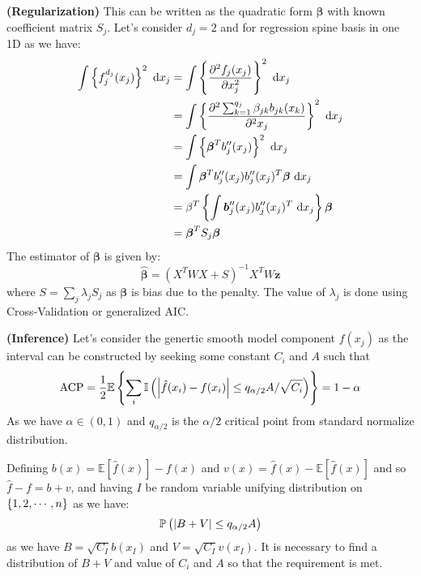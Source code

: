 \begin{remark}{\textbf{(Regularization)}}
    This can be written as the quadratic form $\boldsymbol \beta$ with known coefficient matrix $S_j$. Let's consider $d_j=2$ and for regression spine basis in one 1D as we have:
    \begin{equation*}
    \begin{aligned}
        \int \left\{ f^{d_j}_j(x_j) \right\}^2 \ \mathrm{d} x_j &= \int \left\{ \frac{\partial^2 f_j(x_j)}{\partial x_j^2} \right\}^2\ \mathrm{d} x_j \\
        &= \int \left\{ \frac{\partial^2 \sum^{q_j}_{k=1} \beta_{jk}b_{jk}(x_k) }{\partial^2 x_j} \right\}^2\ \mathrm{d} x_j \\
        &= \int \left\{ \boldsymbol \beta^Tb_j''(x_j) \right\}^2\ \mathrm{d} x_j \\
        &= \int \boldsymbol \beta^Tb_j''(x_j)b_j''(x_j)^T\boldsymbol \beta \ \mathrm{d} x_j \\
        &= \beta^T\left\{ \int \boldsymbol b_j''(x_j)b_j''(x_j)^T \ \mathrm{d} x_j \right\} \boldsymbol \beta \\
        &= \boldsymbol \beta^TS_j\boldsymbol \beta
    \end{aligned}
    \end{equation*}
    The estimator of $\boldsymbol \beta$ is given by:
    \begin{equation*}
        \hat{\boldsymbol \beta} = (X^TWX + S)^{-1}X^TW\boldsymbol z
    \end{equation*}
    where $S = \sum_j\lambda_jS_j$ as $\boldsymbol \beta$ is bias due to the penalty. The value of $\lambda_j$ is done using Cross-Validation or generalized AIC. 
\end{remark}

\begin{remark}{\textbf{(Inference)}}
   Let's consider the genertic smooth model component $f(x_j)$ as the interval can be constructed by seeking some constant $C_i$ and $A$ such that 
   \begin{equation*}
       \operatorname{ACP} = \frac{1}{2}\mathbb{E}\left\{ \sum_i \mathbb{I}\left( \left| \hat{f}(x_i) - f(x_i) \right| \le q_{\alpha/2}A/\sqrt{C_i}  \right) \right\} = 1-\alpha
   \end{equation*}
   As we have $\alpha\in(0, 1)$ and $q_{\alpha/2}$ is the $\alpha/2$ critical point from standard normalize distribution. 
\end{remark}

\begin{remark}
    Defining $b(x) = \mathbb{E}[\hat{f}(x)] - f(x)$ and $v(x) = \hat{f}(x) - \mathbb{E}[\hat{f}(x)]$ and so $\hat{f}-f = b + v$, and having $I$ be random variable unifying distribution on $\left\{ 1,2,\cdots,n \right\}$ as we have:
    \begin{equation*}
        \mathbb{P}\left( \left| B + V \right| \le q_{\alpha/2}A \right)
    \end{equation*}
    as we have $B = \sqrt{C_I} b(x_I)$ and $V = \sqrt{C_I}v(x_I)$. It is necessary to find a distribution of $B + V$ and value of $C_i$ and $A$ so that the requirement is met. 
\end{remark}

